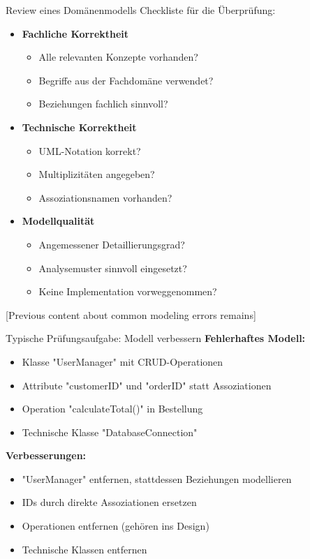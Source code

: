 \begin{KR}{Review eines Domänenmodells}
Checkliste für die Überprüfung:
\begin{itemize}
    \item \textbf{Fachliche Korrektheit}
    \begin{itemize}
        \item Alle relevanten Konzepte vorhanden?
        \item Begriffe aus der Fachdomäne verwendet?
        \item Beziehungen fachlich sinnvoll?
    \end{itemize}
    
    \item \textbf{Technische Korrektheit}
    \begin{itemize}
        \item UML-Notation korrekt?
        \item Multiplizitäten angegeben?
        \item Assoziationsnamen vorhanden?
    \end{itemize}
    
    \item \textbf{Modellqualität}
    \begin{itemize}
        \item Angemessener Detaillierungsgrad?
        \item Analysemuster sinnvoll eingesetzt?
        \item Keine Implementation vorweggenommen?
    \end{itemize}
\end{itemize}
\end{KR}

[Previous content about common modeling errors remains]

\begin{example}{Typische Prüfungsaufgabe: Modell verbessern}
\textbf{Fehlerhaftes Modell:}
\begin{itemize}
    \item Klasse "UserManager" mit CRUD-Operationen
    \item Attribute "customerID" und "orderID" statt Assoziationen
    \item Operation "calculateTotal()" in Bestellung
    \item Technische Klasse "DatabaseConnection"
\end{itemize}

\textbf{Verbesserungen:}
\begin{itemize}
    \item "UserManager" entfernen, stattdessen Beziehungen modellieren
    \item IDs durch direkte Assoziationen ersetzen
    \item Operationen entfernen (gehören ins Design)
    \item Technische Klassen entfernen
\end{itemize}
\end{example}

